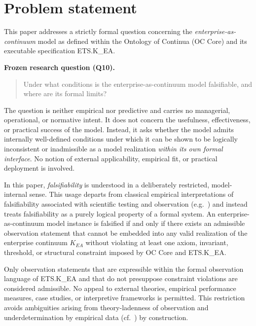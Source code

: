 ﻿\section{Problem statement}

This paper addresses a strictly formal question concerning the
\emph{enterprise-as-continuum} model as defined within the Ontology of
Continua (OC Core) and its executable specification ETS.K\_EA.

\medskip

\noindent
\textbf{Frozen research question (Q10).}
\begin{quote}
Under what conditions is the enterprise-as-continuum model falsifiable,
and where are its formal limits?
\end{quote}

\medskip

The question is neither empirical nor predictive and carries no
managerial, operational, or normative intent.
It does not concern the usefulness, effectiveness, or practical success
of the model.
Instead, it asks whether the model admits internally well-defined
conditions under which it can be shown to be logically inconsistent or
inadmissible as a model realization \emph{within its own formal
interface}.
No notion of external applicability, empirical fit, or practical
deployment is involved.

\medskip

In this paper, \emph{falsifiability} is understood in a deliberately
restricted, model-internal sense.
This usage departs from classical empirical interpretations of
falsifiability associated with scientific testing and observation
(e.g.~\cite{popper1959logic}) and instead treats falsifiability as a
purely logical property of a formal system.
An enterprise-as-continuum model instance is falsified if and only if
there exists an admissible observation statement that cannot be embedded
into any valid realization of the enterprise continuum \(K_{EA}\)
without violating at least one axiom, invariant, threshold, or
structural constraint imposed by OC Core and ETS.K\_EA.

\medskip

Only observation statements that are expressible within the formal
observation language of ETS.K\_EA and that do not presuppose constraint
violations are considered admissible.
No appeal to external theories, empirical performance measures, case
studies, or interpretive frameworks is permitted.
This restriction avoids ambiguities arising from theory-ladenness of
observation and underdetermination by empirical data
(cf.~\cite{quine1951dogmas}) by construction.

